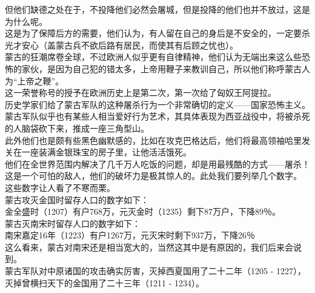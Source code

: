 \begin{multicols}{\theparacolNo}
但他们缺德之处在于，不投降他们必然会屠城，但是投降的他们也并不放过，这是为什么呢。\\

这是为了保障后方的需要，他们认为，有人留在自己的身后是不安全的，一定要杀光才安心（盖蒙古兵不欲后路有居民，而使其有后顾之忧也）。\\

蒙古的狂潮席卷全球，不过欧洲人似乎更有自律精神，他们认为无端出来这么些恐怖的家伙，是因为自己犯的错太多，上帝用鞭子来教训自己，所以他们称呼蒙古人为“上帝之鞭”。\\

这一荣誉称号的授予在欧洲历史上是第二次，第一次给了匈奴王阿提拉。\\

历史学家们给了蒙古军队的这种屠杀行为一个非常确切的定义——国家恐怖主义。\\

蒙古军队似乎也有某些人相当爱好行为艺术，其具体表现为西亚战役中，将被杀死的人脑袋砍下来，推成一座三角型山。\\

此外他们也是颇有些黑色幽默感的，比如在攻克巴格达后，他们将最高领袖哈里发关在一座装满金银珠宝的房子里，让他活活饿死。\\

他们在全世界范围内解决了几千万人吃饭的问题，却是用最残酷的方式——屠杀！\\

这是一个可怕的敌人，他们的破坏力是极其惊人的。此处我们要列举几个数字。\\

这些数字让人看了不寒而栗。\\

蒙古攻灭金国时留存人口的数字如下：\\

金全盛时（1207）有户768万，元灭金时（1235）剩下87万户，下降89％。\\

蒙古灭南宋时留存人口的数字如下：\\

南宋嘉定16年（1223）有户1267万，元灭宋时剩下937万，下降26％\\

这么看来，蒙古对南宋还是相当宽大的，当然这其中是有原因的，我们后来会说到。\\

蒙古军队对中原诸国的攻击确实厉害，灭掉西夏国用了二十二年（1205 - 1227），灭掉曾横扫天下的金国用了二十三年（1211 - 1234）。\\


\end{multicols}
